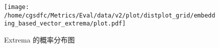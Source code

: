 \begin{figure}[H]%
\centering%
\texttt{[image: /home/cgsdfc/Metrics/Eval/data/v2/plot/distplot\_grid/embedding\_based\_vector\_extrema/plot.pdf]}%
\caption{Extrema 的概率分布图}%
\label{fig:Extremadist}%
\end{figure}